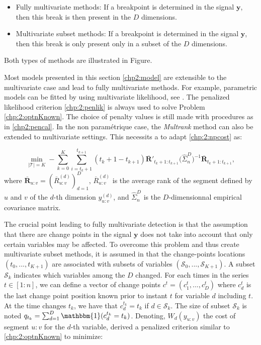 \begin{itemize}
  \item Fully multivariate methods: If a breakpoint is determined in the signal $\bm y$, then this break is then present in the $D$ dimensions. 
  \item Multivariate subset methods: If a breakpoint is determined in the signal $\bm y$, then this break is only present only in a subset of the $D$ dimensions.
\end{itemize}

Both types of methods are illustrated in Figure.


Most models presented in this section \ref{chp2:model} are extensible to the multivariate case and lead to fully multivariate methods. For example, parametric models can be fitted by using multivariate likelihood, see . The penalized likelihood criterion \ref{chp:2:penlik} is always used to solve Problem \ref{chp:2:optnKnown}. The choice of penalty values is still made with procedures as in \ref{chp2:pencal}. In the non paramétrique case, the \textit{Multrank} method can also be extended to multivariate settings. This necessits a to adapt \ref{chp:2:npcost} as:  

\begin{equation}\label{chp:2:npcostmulti}
\min_{\lvert\mathcal{T}\rvert = K}  -\sum_{k=0}^K \sum_{i = t_k+1}^{t_{k+1}} (t_k+1-t_{k+1})\overline{\bm R}'_{t_k+1:t_{k+1}}\bigg(\hat{\Sigma}_n^D\bigg)^{-1}\overline{\bm R}_{t_k+1:t_{k+1}},
\end{equation}       
where $\overline{\bm R}_{u:v} = (\overline{R}^{(d)}_{u:v})_{d=1}^D$, $\overline{R}^{(d)}_{u:v}$ is the average rank of the segment defined by $u$ and $v$ of the $d$-th dimension $y^{(d)}_{u:v}$, and $\hat{\Sigma}_n^D$ is the $D$-dimensionnal empirical covariance matrix. 

The crucial point leading to fully multivariate detection is that the assumption that there are change points in the signal $\bm y$ does not take into account that only certain variables may be affected. To overcome this problem and thus create multivariate subset methods, it is assumed in \cite{pickering2016changepoint} that the change-points locations $(t_0,...,t_{K+1})$ are associated with subsets of variables $(\mathcal{S}_0,...,\mathcal{S}_{K+1})$. A subset $\mathcal{S}_k$ indicates which variables among the $D$ changed. For each times in the series $t \in [1:n]$, we can define a vector of change points $c^t = (c_1^t,...,c_D^t)$ where $c_d^t$ is the last change point position known prior to instant $t$ for variable $d$ including $t$. At the time changes $t_k$, we have that $c_d^{t_k} = t_k$ if $d \in \mathcal{S}_k$. The size of subset $\mathcal{S}_k$ is noted $q_{t_k} = \sum_{d=1}^D\mathbbm{1}(c_d^{t_k} = t_k)$. Denoting, $W_d(y_{u:v})$ the cost of segment $u:v$ for the $d$-th variable, \cite{pickering2016changepoint} derived a penalized criterion similar to \ref{chp:2:optnKnown} to minimize: 

